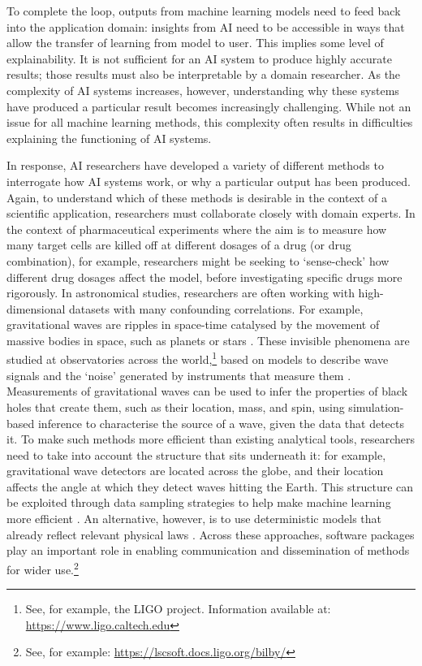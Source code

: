 To complete the loop, outputs from machine learning models need to feed
back into the application domain: insights from AI need to be accessible
in ways that allow the transfer of learning from model to user. This
implies some level of explainability. It is not sufficient for an AI
system to produce highly accurate results; those results must also be
interpretable by a domain researcher. As the complexity of AI systems
increases, however, understanding why these systems have produced a
particular result becomes increasingly challenging. While not an issue
for all machine learning methods, this complexity often results in
difficulties explaining the functioning of AI systems.

In response, AI researchers have developed a variety of different
methods to interrogate how AI systems work, or why a particular output
has been produced. Again, to understand which of these methods is
desirable in the context of a scientific application, researchers must
collaborate closely with domain experts. In the context of
pharmaceutical experiments where the aim is to measure how many target
cells are killed off at different dosages of a drug (or drug
combination), for example, researchers might be seeking to `sense-check'
how different drug dosages affect the model, before investigating
specific drugs more rigorously. In astronomical studies, researchers are
often working with high-dimensional datasets with many confounding
correlations. For example, gravitational waves are ripples in space-time
catalysed by the movement of massive bodies in space, such as planets or
stars \cite{NASA-gravitational}.
These invisible phenomena are studied at observatories across the
world,\footnote{See, for example, the LIGO project. Information
  available at:
  \url{https://www.ligo.caltech.edu}}
based on models to describe wave signals and the `noise' generated by
instruments that measure them \cite{Dax-gravitational21}.
Measurements of gravitational waves can be used to infer the properties
of black holes that create them, such as their location, mass, and spin,
using simulation-based inference to characterise the source of a wave,
given the data that detects it. To make such methods more efficient than
existing analytical tools, researchers need to take into account the
structure that sits underneath it: for example, gravitational wave
detectors are located across the globe, and their location affects the
angle at which they detect waves hitting the Earth. This structure can
be exploited through data sampling strategies to help make machine
learning more efficient \cite{Dax-gravitational21}. An alternative, however, is to
use deterministic models that already reflect relevant physical
laws \cite{Bodin-black21}. Across these approaches,
software packages play an important role in enabling communication and
dissemination of methods for wider use.\footnote{See, for example:
  \url{https://lscsoft.docs.ligo.org/bilby/}}


